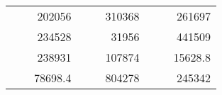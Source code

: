 \begin{table}[H]
\begin{tabular}{|ccrccrccc}
\rowcolor[HTML]{DAE8FC} 
\multicolumn{1}{|c|}{\cellcolor[HTML]{FFFFC7}}                                & \multicolumn{1}{c|}{\cellcolor[HTML]{DAE8FC}}                      & \multicolumn{1}{r|}{\cellcolor[HTML]{DAE8FC}202056}    & \multicolumn{1}{c|}{\cellcolor[HTML]{FFFFC7}}                                & \multicolumn{1}{c|}{\cellcolor[HTML]{DAE8FC}}                       & \multicolumn{1}{r|}{\cellcolor[HTML]{DAE8FC}310368}    & \multicolumn{1}{c|}{\cellcolor[HTML]{FFFFC7}}                                & \multicolumn{1}{c|}{\cellcolor[HTML]{DAE8FC}}                      & \multicolumn{1}{r|}{\cellcolor[HTML]{DAE8FC}261697}    \\ \cline{3-3} \cline{6-6} \cline{9-9} 
\multicolumn{1}{|c|}{\cellcolor[HTML]{FFFFC7}}                                & \multicolumn{1}{c|}{\cellcolor[HTML]{DAE8FC}}                      & \multicolumn{1}{r|}{\cellcolor[HTML]{DDFDFF}234528}    & \multicolumn{1}{c|}{\cellcolor[HTML]{FFFFC7}}                                & \multicolumn{1}{c|}{\cellcolor[HTML]{DAE8FC}}                       & \multicolumn{1}{r|}{\cellcolor[HTML]{DDFDFF}31956}     & \multicolumn{1}{c|}{\cellcolor[HTML]{FFFFC7}}                                & \multicolumn{1}{c|}{\cellcolor[HTML]{DAE8FC}}                      & \multicolumn{1}{r|}{\cellcolor[HTML]{DDFDFF}441509}    \\ \cline{3-3} \cline{6-6} \cline{9-9} 
\rowcolor[HTML]{DAE8FC} 
\multicolumn{1}{|c|}{\cellcolor[HTML]{FFFFC7}}                                & \multicolumn{1}{c|}{\cellcolor[HTML]{DAE8FC}}                      & \multicolumn{1}{r|}{\cellcolor[HTML]{DAE8FC}238931}    & \multicolumn{1}{c|}{\cellcolor[HTML]{FFFFC7}}                                & \multicolumn{1}{c|}{\cellcolor[HTML]{DAE8FC}}                       & \multicolumn{1}{r|}{\cellcolor[HTML]{DAE8FC}107874}    & \multicolumn{1}{c|}{\cellcolor[HTML]{FFFFC7}}                                & \multicolumn{1}{c|}{\cellcolor[HTML]{DAE8FC}}                      & \multicolumn{1}{r|}{\cellcolor[HTML]{DAE8FC}15628.8}   \\ \cline{3-3} \cline{6-6} \cline{9-9} 
\multicolumn{1}{|c|}{\cellcolor[HTML]{FFFFC7}}                                & \multicolumn{1}{c|}{\cellcolor[HTML]{DAE8FC}}                      & \multicolumn{1}{r|}{\cellcolor[HTML]{DDFDFF}78698.4}   & \multicolumn{1}{c|}{\cellcolor[HTML]{FFFFC7}}                                & \multicolumn{1}{c|}{\cellcolor[HTML]{DAE8FC}}                       & \multicolumn{1}{r|}{\cellcolor[HTML]{DDFDFF}804278}    & \multicolumn{1}{c|}{\cellcolor[HTML]{FFFFC7}}                                & \multicolumn{1}{c|}{\cellcolor[HTML]{DAE8FC}}                      & \multicolumn{1}{r|}{\cellcolor[HTML]{DDFDFF}245342}    \\ \cline{3-3} \cline{6-6} \cline{9-9} 

\end{tabular}
\end{table}
